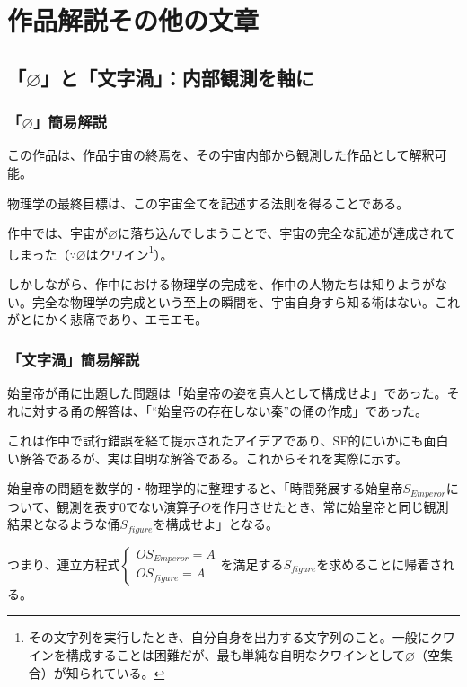 \documentclass[10pt, a5paper, twoside]{jsarticle}
\begin{document}
	\section{作品解説その他の文章}

		\subsection{「$\varnothing$」と「文字渦」：内部観測を軸に}
			
			\subsubsection{「$\varnothing$」簡易解説}

				この作品は、作品宇宙の終焉を、その宇宙内部から観測した作品として解釈可能。

				物理学の最終目標は、この宇宙全てを記述する法則を得ることである\cite{Hawking}。

				作中では、宇宙が$ \varnothing$に落ち込んでしまうことで、宇宙の完全な記述が達成されてしまった（$ \because \varnothing$はクワイン\footnote{その文字列を実行したとき、自分自身を出力する文字列のこと。一般にクワインを構成することは困難だが、最も単純な自明なクワインとして$ \varnothing $（空集合）が知られている。}）。

				しかしながら、作中における物理学の完成を、作中の人物たちは知りようがない。完全な物理学の完成という至上の瞬間を、宇宙自身すら知る術はない。これがとにかく悲痛であり、エモエモ。

			\subsubsection{「文字渦」簡易解説}

				始皇帝が甬に出題した問題は「始皇帝の姿を真人として構成せよ」であった。それに対する甬の解答は、「“始皇帝の存在しない秦”の俑の作成」であった。

				これは作中で試行錯誤を経て提示されたアイデアであり、SF的にいかにも面白い解答であるが、実は自明な解答である。これからそれを実際に示す。

				始皇帝の問題を数学的・物理学的に整理すると、「時間発展する始皇帝$ S_{Emperor} $について、観測を表す0でない演算子$ O $を作用させたとき、常に始皇帝と同じ観測結果となるような俑$ S_{figure} $を構成せよ」となる。

				つまり、連立方程式$ \begin{cases} O S_{Emperor} = A \\ O S_{figure} = A \end{cases} $を満足する$ S_{figure} $を求めることに帰着される。
\end{document}
